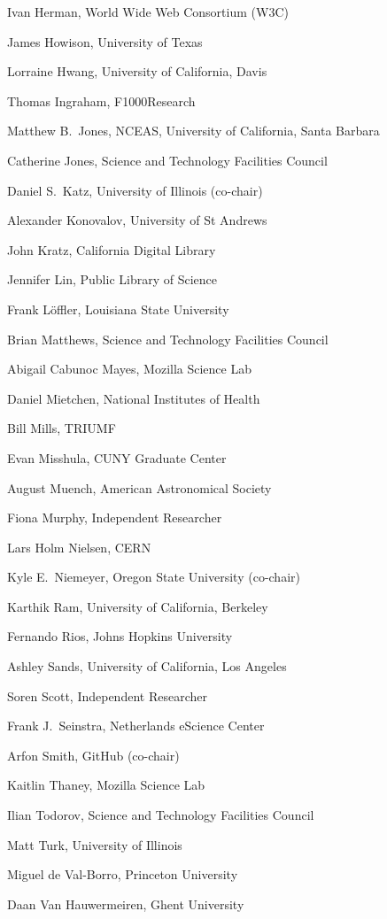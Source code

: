 \documentclass[12pt, oneside]{amsart}
\begin{document}
Ivan Herman, World Wide Web Consortium (W3C)

James Howison, University of Texas

Lorraine Hwang, University of California,  Davis

Thomas Ingraham, F1000Research

Matthew B.~Jones, NCEAS, University of California,  Santa Barbara

Catherine Jones, Science and Technology Facilities Council

Daniel S.~Katz, University of Illinois (co-chair)

Alexander Konovalov, University of St Andrews

John Kratz, California Digital Library

Jennifer Lin, Public Library of Science

Frank L\"offler, Louisiana State University

Brian Matthews, Science and Technology Facilities Council

Abigail Cabunoc Mayes, Mozilla Science Lab

Daniel Mietchen, National Institutes of Health

Bill Mills, TRIUMF

Evan Misshula, CUNY Graduate Center

August Muench, American Astronomical Society

Fiona Murphy, Independent Researcher

Lars Holm Nielsen, CERN

Kyle E.~Niemeyer, Oregon State University (co-chair)

Karthik Ram, University of California, Berkeley

Fernando Rios, Johns Hopkins University

Ashley Sands, University of California, Los Angeles

Soren Scott, Independent Researcher

Frank J.~Seinstra, Netherlands eScience Center

Arfon Smith, GitHub (co-chair)

Kaitlin Thaney, Mozilla Science Lab

Ilian Todorov, Science and Technology Facilities Council

Matt Turk, University of Illinois

Miguel de Val-Borro, Princeton University

Daan Van Hauwermeiren, Ghent University
\end{document}
